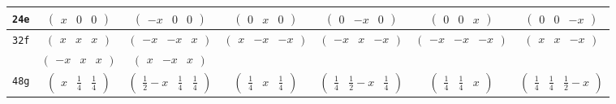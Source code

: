 \documentclass[fleqn,9pt,landscape]{jsarticle}
\begin{document}
\begin{center}
\begin{longtable}{ccccccc}
{\tt 24e} & $ \begin{pmatrix} x & 0 & 0 \end{pmatrix} $ & $ \begin{pmatrix} - x & 0 & 0 \end{pmatrix} $ & $ \begin{pmatrix} 0 & x & 0 \end{pmatrix} $ & $ \begin{pmatrix} 0 & - x & 0 \end{pmatrix} $ & $ \begin{pmatrix} 0 & 0 & x \end{pmatrix} $ & $ \begin{pmatrix} 0 & 0 & - x \end{pmatrix} $ \\ \hline
{\tt 32f} & $ \begin{pmatrix} x & x & x \end{pmatrix} $ & $ \begin{pmatrix} - x & - x & x \end{pmatrix} $ & $ \begin{pmatrix} x & - x & - x \end{pmatrix} $ & $ \begin{pmatrix} - x & x & - x \end{pmatrix} $ & $ \begin{pmatrix} - x & - x & - x \end{pmatrix} $ & $ \begin{pmatrix} x & x & - x \end{pmatrix} $ \\
& $ \begin{pmatrix} - x & x & x \end{pmatrix} $ & $ \begin{pmatrix} x & - x & x \end{pmatrix} $ & $  $ & $  $ & $  $ & $  $ \\ \hline
{\tt 48g} & $ \begin{pmatrix} x & \frac{1}{4} & \frac{1}{4} \end{pmatrix} $ & $ \begin{pmatrix} \frac{1}{2} - x & \frac{1}{4} & \frac{1}{4} \end{pmatrix} $ & $ \begin{pmatrix} \frac{1}{4} & x & \frac{1}{4} \end{pmatrix} $ & $ \begin{pmatrix} \frac{1}{4} & \frac{1}{2} - x & \frac{1}{4} \end{pmatrix} $ & $ \begin{pmatrix} \frac{1}{4} & \frac{1}{4} & x \end{pmatrix} $ & $ \begin{pmatrix} \frac{1}{4} & \frac{1}{4} & \frac{1}{2} - x \end{pmatrix} $ \\

\end{longtable}
\end{center}
\end{document}
